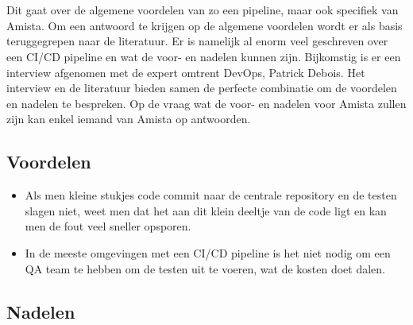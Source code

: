 
\chapter{}
\label{ch:voor-en-nadelen-cicd}
Dit gaat over de algemene voordelen van zo een pipeline, maar ook specifiek van Amista. Om een antwoord te krijgen op de algemene voordelen wordt er als basis teruggegrepen naar de literatuur. Er is namelijk al enorm veel geschreven over een CI/CD pipeline en wat de voor- en nadelen kunnen zijn.
Bijkomstig is er een interview afgenomen met de expert omtrent DevOps, Patrick Debois.
Het interview en de literatuur bieden samen de perfecte combinatie om de voordelen en nadelen te bespreken.
Op de vraag wat de voor- en nadelen voor Amista zullen zijn kan enkel iemand van Amista op antwoorden.


\section{Voordelen}
\label{sec:voordelen}
\begin{itemize}
    \item Als men kleine stukjes code commit naar de centrale repository en de testen slagen niet, weet men dat het aan dit klein deeltje van de code ligt en kan men de fout veel sneller opsporen. %
    \item In de meeste omgevingen met een CI/CD pipeline is het niet nodig om een QA team te hebben om de testen uit te voeren, wat de kosten doet dalen.
\end{itemize}

\section{Nadelen}
\label{sec:nadelen}
